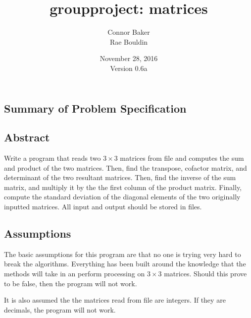 \documentclass[12pt]{article}
\begin{document}
\null
\nointerlineskip 
\vfill
\let \snewpage \newpage
\let \newpage \relax
    \title{groupproject: matrices}
    \author{Connor Baker\\Rae Bouldin}
    \date{November 28, 2016\\Version 0.6a}
\maketitle
\let \newpage \snewpage
\vfill
\thispagestyle{empty}



\newpage %



\makeatletter
{}
\makeatother
\tableofcontents

\clearpage
{}

\begin{center}
\section{Summary of Problem Specification}
\end{center}
\subsection{Abstract}
Write a program that reads two $3\times3$ matrices from file and computes the sum and product of the two matrices. Then, find the transpose, cofactor matrix, and determinant of the two resultant matrices. Then, find the inverse of the sum matrix, and multiply it by the the first column of the product matrix. Finally, compute the standard deviation of the diagonal elements of the two originally inputted matrices.
All input and output should be stored in files.

\subsection{Assumptions}
The basic assumptions for this program are that no one is trying very hard to break the algorithms. Everything has been built around the knowledge that the methods will take in an perform processing on $3\times3$ matrices. Should this prove to be false, then the program will not work.
\par It is also assumed the the matrices read from file are integers. If they are decimals, the program will not work.
\end{document}

